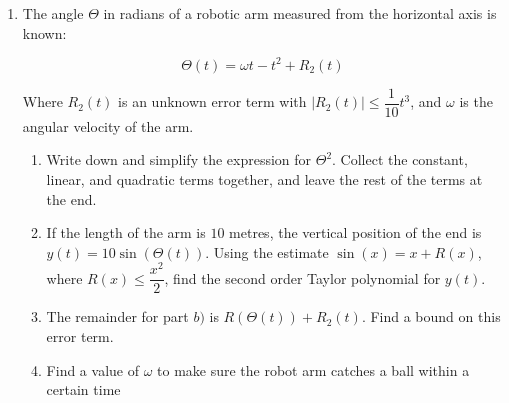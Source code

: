 \begin{enumerate}
    \item The angle $\Theta$ in radians of a robotic arm measured from the horizontal axis is known:

    \[\Theta(t) = \omega t - t^2 + R_2(t) \]

    Where $R_2(t)$ is an unknown error term with $|R_2(t)| \leq \dfrac{1}{10}t^3$, and $\omega$ is the angular velocity of the arm. 
    \begin{enumerate}

        \item Write down and simplify the expression for $\Theta^2$. Collect the constant, linear, and quadratic terms together, and leave the rest of the terms at the end. 

        
        \item If the length of the arm is $10$ metres, the vertical position of the end is $y(t) = 10 \sin(\Theta(t))$. Using the estimate $\sin(x) = x + R(x)$, where $R(x) \leq \dfrac{x^2}{2}$, find the second order Taylor polynomial for $y(t)$.
        
        \item  The remainder for part $b)$ is $R(\Theta(t)) + R_2(t)$. Find a bound on this error term.  

        \item Find a value of $\omega$ to make sure the robot arm catches a ball within a certain time

        
    \end{enumerate}
		
\end{enumerate}
